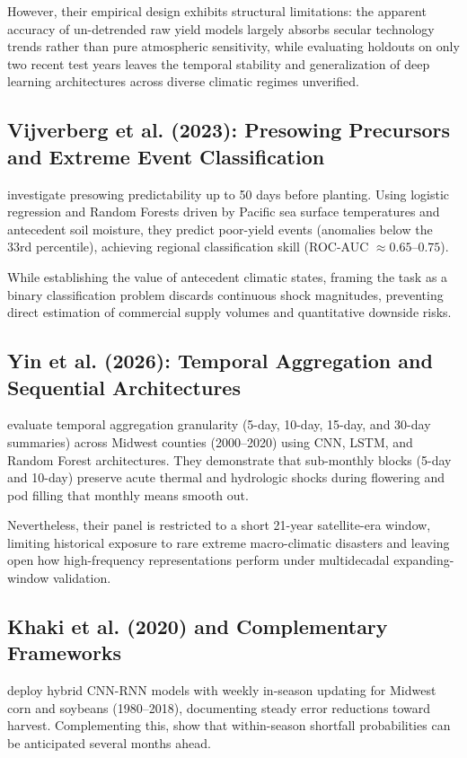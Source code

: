However, their empirical design exhibits structural limitations: the apparent accuracy of un-detrended raw yield models largely absorbs secular technology trends rather than pure atmospheric sensitivity, while evaluating holdouts on only two recent test years leaves the temporal stability and generalization of deep learning architectures across diverse climatic regimes unverified.

\subsection{Vijverberg et al. (2023): Presowing Precursors and Extreme Event Classification}
\citet{Vijverberg2023} investigate presowing predictability up to 50 days before planting. Using logistic regression and Random Forests driven by Pacific sea surface temperatures and antecedent soil moisture, they predict poor-yield events (anomalies below the 33rd percentile), achieving regional classification skill (ROC-AUC $\approx 0.65$--$0.75$). 

While establishing the value of antecedent climatic states, framing the task as a binary classification problem discards continuous shock magnitudes, preventing direct estimation of commercial supply volumes and quantitative downside risks.

\subsection{Yin et al. (2026): Temporal Aggregation and Sequential Architectures}
\citet{Yinetal2026} evaluate temporal aggregation granularity (5-day, 10-day, 15-day, and 30-day summaries) across Midwest counties (2000--2020) using CNN, LSTM, and Random Forest architectures. They demonstrate that sub-monthly blocks (5-day and 10-day) preserve acute thermal and hydrologic shocks during flowering and pod filling that monthly means smooth out. 

Nevertheless, their panel is restricted to a short 21-year satellite-era window, limiting historical exposure to rare extreme macro-climatic disasters and leaving open how high-frequency representations perform under multidecadal expanding-window validation.

\subsection{Khaki et al. (2020) and Complementary Frameworks}
\citet{Khaki2020} deploy hybrid CNN-RNN models with weekly in-season updating for Midwest corn and soybeans (1980--2018), documenting steady error reductions toward harvest. Complementing this, \citet{Iizumietal2021} show that within-season shortfall probabilities can be anticipated several months ahead. 

